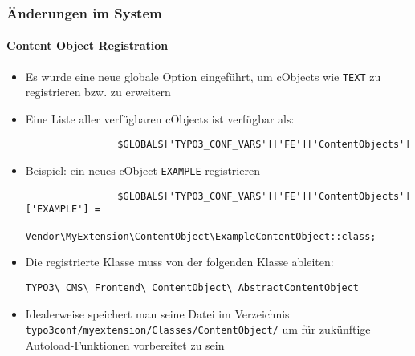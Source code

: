 
\begin{frame}[fragile]
	\frametitle{Änderungen im System}
	\framesubtitle{Content Object Registration}

	\begin{itemize}

		\item Es wurde eine neue globale Option eingeführt, um cObjects wie
			\texttt{TEXT} zu registrieren bzw. zu erweitern

		\item Eine Liste aller verfügbaren cObjects ist verfügbar als:

			\begin{lstlisting}
				$GLOBALS['TYPO3_CONF_VARS']['FE']['ContentObjects']
			\end{lstlisting}

		\item Beispiel: ein neues cObject \texttt{EXAMPLE} registrieren

			\begin{lstlisting}
				$GLOBALS['TYPO3_CONF_VARS']['FE']['ContentObjects']['EXAMPLE'] =
				  Vendor\MyExtension\ContentObject\ExampleContentObject::class;
			\end{lstlisting}

		\item Die registrierte Klasse muss von der folgenden Klasse ableiten:

			\small
				\texttt{TYPO3\textbackslash
					CMS\textbackslash
					Frontend\textbackslash
					ContentObject\textbackslash
					AbstractContentObject}
			\normalsize

		\item Idealerweise speichert man seine Datei im Verzeichnis\newline
			\small
				\texttt{typo3conf/myextension/Classes/ContentObject/}
			\normalsize\newline
			um für zukünftige Autoload-Funktionen vorbereitet zu sein

	\end{itemize}

\end{frame}


